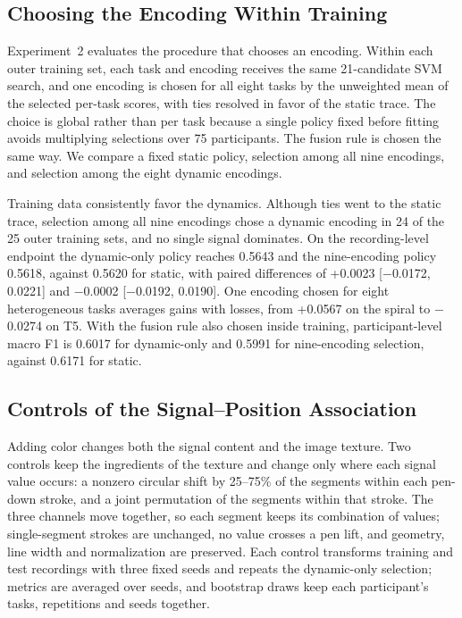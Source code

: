 \subsection{Choosing the Encoding Within Training}
\label{sec:nested-followup}
\noindent
Experiment~2 evaluates the procedure that chooses an encoding. Within each outer training set, each task and encoding receives the same 21-candidate SVM search, and one encoding is chosen for all eight tasks by the unweighted mean of the selected per-task scores, with ties resolved in favor of the static trace. The choice is global rather than per task because a single policy fixed before fitting avoids multiplying selections over 75 participants. The fusion rule is chosen the same way. We compare a fixed static policy, selection among all nine encodings, and selection among the eight dynamic encodings.

Training data consistently favor the dynamics. Although ties went to the static trace, selection among all nine encodings chose a dynamic encoding in 24 of the 25 outer training sets, and no single signal dominates. On the recording-level endpoint the dynamic-only policy reaches 0.5643 and the nine-encoding policy 0.5618, against 0.5620 for static, with paired differences of +0.0023 [$-$0.0172, 0.0221] and $-$0.0002 [$-$0.0192, 0.0190]. One encoding chosen for eight heterogeneous tasks averages gains with losses, from +0.0567 on the spiral to $-$0.0274 on T5. With the fusion rule also chosen inside training, participant-level macro F1 is 0.6017 for dynamic-only and 0.5991 for nine-encoding selection, against 0.6171 for static.

\subsection{Controls of the Signal--Position Association}
\label{sec:controls}
\noindent
Adding color changes both the signal content and the image texture. Two controls keep the ingredients of the texture and change only where each signal value occurs: a nonzero circular shift by 25--75\% of the segments within each pen-down stroke, and a joint permutation of the segments within that stroke. The three channels move together, so each segment keeps its combination of values; single-segment strokes are unchanged, no value crosses a pen lift, and geometry, line width and normalization are preserved. Each control transforms training and test recordings with three fixed seeds and repeats the dynamic-only selection; metrics are averaged over seeds, and bootstrap draws keep each participant's tasks, repetitions and seeds together.

